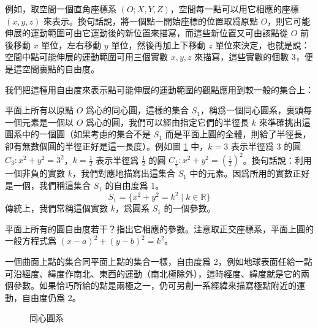 例如，取空間一個直角座標系 $(O; X, Y, Z)$，空間每一點可以用它相應的座標 $(x, y, z)$ 來表示。換句話說，將一個點一開始座標的位置取爲原點 $O$，則它可能伸展的運動範圍可由它運動後的新位置來描寫，而這些新位置又可由該點從 $O$ 前後移動 $x$ 單位，左右移動 $y$ 單位，然後再加上下移動 $z$ 單位來決定，也就是說：空間中點可能伸展的運動範圍可用三個實數 $x, y, z$ 來描寫，這些實數的個數 3，便是這空間裏點的自由度。

我們把這種用自由度來表示點可能伸展的運動範圍的觀點應用到較一般的集合上：

\begin{example}
平面上所有以原點 $O$ 爲心的同心圓，這樣的集合 $S_1$，稱爲一個同心圓系，裏頭每一個元素是一個以 $O$ 爲心的圓，我們可以經由指定它們的半徑長 $k$ 來準確挑出這圓系中的一個圓（如果考慮的集合不是 $S_1$ 而是平面上圓的全體，則給了半徑長，卻有無數個圓的半徑正好是這一長度）。例如圖 \ref{fig:4-47} 中，$k = 3$ 表示半徑爲 3 的圓 $C_3 : x^2 + y^2 = 3^2$，$k = \frac{1}{2}$ 表示半徑爲 $\frac{1}{2}$ 的圓 $C_{\frac{1}{2}} : x^2 + y^2 = \left(\frac{1}{2}\right)^2$。換句話說：利用一個非負的實數 $k$，我們對應地描寫出這集合 $S_1$ 中的元素。因爲所用的實數正好是一個，我們稱這集合 $S_1$ 的自由度爲 1。
\[
S_1 = \{x^2 + y^2 = k^2 \mid k \in \mathbb{R}\}
\]
傳統上，我們常稱這個實數 $k$，爲圓系 $S_1$ 的一個參數。
\end{example}

\begin{exercise}[作業 26]
平面上所有的圓自由度若干？指出它相應的參數。注意取正交座標系，平面上圓的一般方程式爲 $(x - a)^2 + (y - b)^2 = k^2$。
\end{exercise}

\begin{example}
一個曲面上點的集合同平面上點的集合一樣，自由度爲 2，例如地球表面任給一點可沿經度、緯度作南北、東西的運動（南北極除外），這時經度、緯度就是它的兩個參數。如果恰巧所給的點是兩極之一，仍可另創一系經緯來描寫極點附近的運動，自由度仍爲 2。
\end{example}

\begin{figure}[H]
\centering
{}
\caption{同心圓系}
\label{fig:4-47}
\end{figure}

